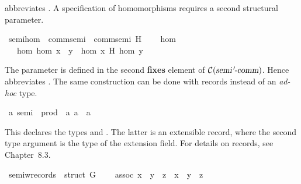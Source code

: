\begin{isabellebody}
\begin{isamarkuptext}
  abbreviates .  A specification of homomorphisms
  requires a second structural parameter.%
\end{isamarkuptext}%
\isamarkupfalse%
\ semi{\isacharprime}{\isacharunderscore}hom\ {\isacharequal}\ comm{\isacharunderscore}semi{\isacharprime}\ {\isacharplus}\ comm{\isacharunderscore}semi{\isacharprime}\ H\ {\isacharplus}\isanewline
\ \ \ hom\isanewline
\ \ \ hom{\isacharcolon}\ {\isachardoublequote}hom\ {\isacharparenleft}x\ {\isasymstar}\ y{\isacharparenright}\ {\isacharequal}\ hom\ x\ {\isasymstar}\isactrlbsub H\isactrlesub \ hom\ y{\isachardoublequote}\isamarkuptrue%
%
\begin{isamarkuptext}%
The parameter  is defined in the second \textbf{fixes}
  element of $\mathcal{C}(\emph{\sl semi{\emph{$\mskip2mu{'}\mskip-2mu$}}{\mbox{-}}comm})$. Hence 
  abbreviates .  The same construction can be done
  with records instead of an \textit{ad-hoc} type.%
\end{isamarkuptext}%
\isamarkupfalse%
\ {\isacharprime}a\ semi\ {\isacharequal}\ prod\ {\isacharcolon}{\isacharcolon}\ {\isachardoublequote}{\isacharbrackleft}{\isacharprime}a{\isacharcomma}\ {\isacharprime}a{\isacharbrackright}\ {\isasymRightarrow}\ {\isacharprime}a{\isachardoublequote}\ {\isacharparenleft}\ {\isachardoublequote}{\isasymbullet}{\isasymindex}{\isachardoublequote}\ {}{}{\isacharparenright}\isamarkuptrue%
%
\begin{isamarkuptext}%
This declares the types  and  .  The latter is an extensible record, where the second
  type argument is the type of the extension field.  For details on
  records, see \cite{NipkowEtAl2002} Chapter~8.3.%
\end{isamarkuptext}%
\isamarkupfalse%
\ semi{\isacharunderscore}w{\isacharunderscore}records\ {\isacharequal}\ struct\ G\ {\isacharplus}\isanewline
\ \ \ assoc{\isacharcolon}\ {\isachardoublequote}{\isacharparenleft}x\ {\isasymbullet}\ y{\isacharparenright}\ {\isasymbullet}\ z\ {\isacharequal}\ x\ {\isasymbullet}\ {\isacharparenleft}y\ {\isasymbullet}\ z{\isacharparenright}{\isachardoublequote}\isamarkuptrue%
%
\begin{isamarkuptext}%

\end{isamarkuptext}
\end{isabellebody}
